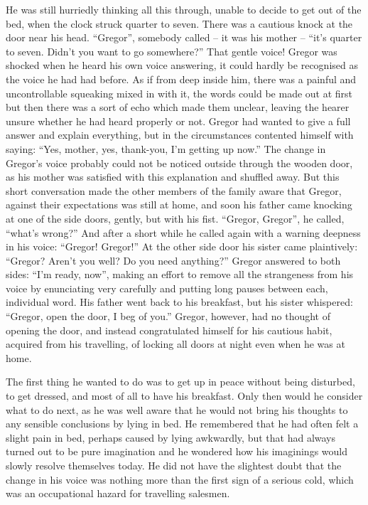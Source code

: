 He was still hurriedly thinking all this through, unable to decide to
get out of the bed, when the clock struck quarter to seven. There was a
cautious knock at the door near his head. “Gregor”, somebody called – it
was his mother – “it’s quarter to seven. Didn’t you want to go
somewhere?” That gentle voice! Gregor was shocked when he heard his own
voice answering, it could hardly be recognised as the voice he had had
before. As if from deep inside him, there was a painful and
uncontrollable squeaking mixed in with it, the words could be made out
at first but then there was a sort of echo which made them unclear,
leaving the hearer unsure whether he had heard properly or not. Gregor
had wanted to give a full answer and explain everything, but in the
circumstances contented himself with saying: “Yes, mother, yes,
thank-you, I’m getting up now.” The change in Gregor’s voice probably
could not be noticed outside through the wooden door, as his mother was
satisfied with this explanation and shuffled away. But this short
conversation made the other members of the family aware that Gregor,
against their expectations was still at home, and soon his father came
knocking at one of the side doors, gently, but with his fist. “Gregor,
Gregor”, he called, “what’s wrong?” And after a short while he called
again with a warning deepness in his voice: “Gregor! Gregor!” At the
other side door his sister came plaintively: “Gregor? Aren’t you well?
Do you need anything?” Gregor answered to both sides: “I’m ready, now”,
making an effort to remove all the strangeness from his voice by
enunciating very carefully and putting long pauses between each,
individual word. His father went back to his breakfast, but his sister
whispered: “Gregor, open the door, I beg of you.” Gregor, however, had
no thought of opening the door, and instead congratulated himself for
his cautious habit, acquired from his travelling, of locking all doors
at night even when he was at home.

The first thing he wanted to do was to get up in peace without being
disturbed, to get dressed, and most of all to have his breakfast. Only
then would he consider what to do next, as he was well aware that he
would not bring his thoughts to any sensible conclusions by lying in
bed. He remembered that he had often felt a slight pain in bed, perhaps
caused by lying awkwardly, but that had always turned out to be pure
imagination and he wondered how his imaginings would slowly resolve
themselves today. He did not have the slightest doubt that the change
in his voice was nothing more than the first sign of a serious cold,
which was an occupational hazard for travelling salesmen.


